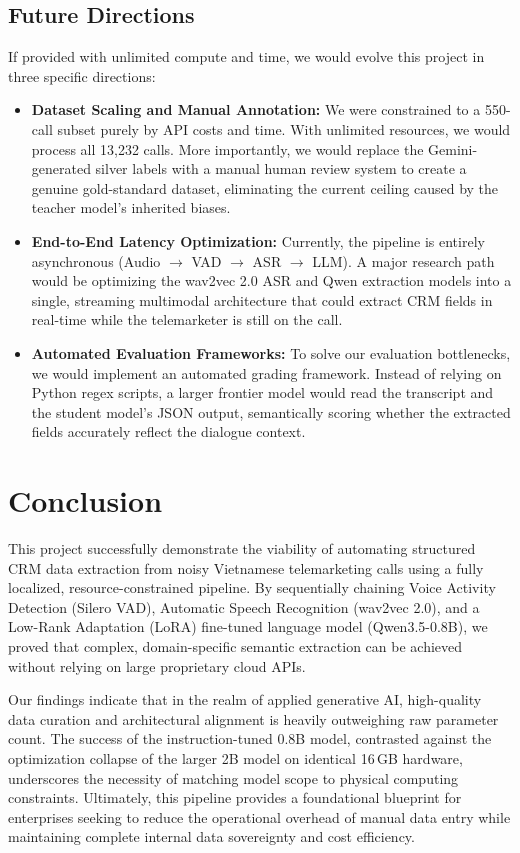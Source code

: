 \documentclass[unnumsec,webpdf,modern,large]{oup-authoring-template}%
\theoremstyle{thmstyleone}%
\theoremstyle{thmstyletwo}%
\theoremstyle{thmstylethree}%
\begin{document}
\subsection{Future Directions}
If provided with unlimited compute and time, we would evolve this project in three specific directions:
\begin{itemize}
    \item \textbf{Dataset Scaling and Manual Annotation:} We were constrained to a 550-call subset purely by API costs and time. With unlimited resources, we would process all 13,232 calls. More importantly, we would replace the Gemini-generated silver labels with a manual human review system to create a genuine gold-standard dataset, eliminating the current ceiling caused by the teacher model's inherited biases.
    \item \textbf{End-to-End Latency Optimization:} Currently, the pipeline is entirely asynchronous (Audio $\rightarrow$ VAD $\rightarrow$ ASR $\rightarrow$ LLM). A major research path would be optimizing the wav2vec 2.0 ASR and Qwen extraction models into a single, streaming multimodal architecture that could extract CRM fields in real-time while the telemarketer is still on the call.
    \item \textbf{Automated Evaluation Frameworks:} To solve our evaluation bottlenecks, we would implement an automated grading framework. Instead of relying on Python regex scripts, a larger frontier model would read the transcript and the student model's JSON output, semantically scoring whether the extracted fields accurately reflect the dialogue context.
\end{itemize}

\section{Conclusion}
\label{sec:conclusion}

This project successfully demonstrate the viability of automating structured CRM data extraction from noisy Vietnamese telemarketing calls using a fully localized, resource-constrained pipeline. By sequentially chaining Voice Activity Detection (Silero VAD), Automatic Speech Recognition (wav2vec 2.0), and a Low-Rank Adaptation (LoRA) fine-tuned language model (Qwen3.5-0.8B), we proved that complex, domain-specific semantic extraction can be achieved without relying on large proprietary cloud APIs. 

Our findings indicate that in the realm of applied generative AI, high-quality data curation and architectural alignment is heavily outweighing raw parameter count. The success of the instruction-tuned 0.8B model, contrasted against the optimization collapse of the larger 2B model on identical 16\,GB hardware, underscores the necessity of matching model scope to physical computing constraints. Ultimately, this pipeline provides a foundational blueprint for enterprises seeking to reduce the operational overhead of manual data entry while maintaining complete internal data sovereignty and cost efficiency.



\end{document}
